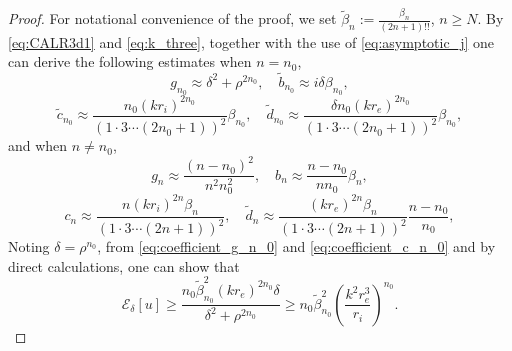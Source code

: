 \documentclass[11pt,reqno,twoside]{amsart}
\theoremstyle{definition}
\theoremstyle{remark}
\numberwithin{equation}{section}
\begin{document}
\begin{proof}
For notational convenience of the proof, we set $\tilde\beta_n:=\frac{\beta_n}{(2n+1)!!}$, $n\geq N$. By \eqref{eq:CALR3d1} and \eqref{eq:k_three}, together with the use of \eqref{eq:asymptotic_j} one can derive the following estimates when $n=n_0$,
\begin{equation}\label{eq:coefficient_g_n_0}
  g_{n_0}\approx \delta^2 + \rho^{2n_0},\quad  \tilde{b}_{n_0}\approx i\delta \beta_{n_0},
\end{equation}
\begin{equation}\label{eq:coefficient_c_n_0}
 \tilde{c}_{n_0}\approx \frac{n_0(kr_i)^{2n_0}}{(1\cdot 3 \cdots (2n_0+1))^2} \beta_{n_0},\quad  \tilde{d}_{n_0}\approx \frac{\delta n_0(kr_e)^{2n_0}}{(1\cdot 3 \cdots (2n_0+1))^2} \beta_{n_0},
\end{equation}
and when $n\neq n_0$,
\begin{equation}\label{eq:coefficient_g_n}
  g_n\approx  \frac{(n-n_0)^2}{n^2 n_0^2},\quad  b_n\approx \frac{n-n_0}{nn_0}\beta_n,
\end{equation}
\begin{equation}\label{eq:coefficient_d_n}
  c_n\approx \frac{n(kr_i)^{2n} \beta_n}{(1\cdot 3 \cdots (2n+1))^2},\quad  \tilde{d}_n \approx  \frac{(kr_e)^{2n}\beta_n }{(1\cdot 3 \cdots (2n+1))^2}  \frac{n-n_0}{n_0},
\end{equation}
Noting $\delta=\rho^{n_0}$, from \eqref{eq:coefficient_g_n_0} and \eqref{eq:coefficient_c_n_0} and by direct calculations, one can show that
\begin{equation}\label{eq:energy_estimate_with_core}
   \mathscr{E}_{\delta}[u]\geq\frac{n_0\tilde{\beta}_{n_0}^2 (kr_e)^{2n_0} \delta } {\delta^2+\rho^{2n_0}}\geq n_0\tilde{\beta}_{n_0}^2 \left( \frac{k^2r_e^3}{r_i} \right)^{n_0}.

\end{equation}
\end{proof}
\end{document}
